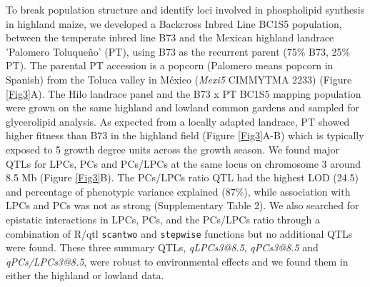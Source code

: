 \documentclass[9pt,twocolumn,twoside,lineno]{BioRxiv}
\def\code#1{\texttt{#1}}
\begin{document}
To break population structure and identify loci involved in phospholipid synthesis in highland maize, we developed a Backcross Inbred Line BC1S5 population, between the temperate inbred line B73 and the Mexican highland landrace 'Palomero Toluqueño' (PT), using B73 as the recurrent parent (75\% B73, 25\% PT). 
The parental PT accession is a popcorn (Palomero means popcorn in Spanish) from the Toluca valley in México (\textit{Mexi5} CIMMYTMA 2233) (Figure \ref{Fig3}A). 
The Hilo landrace panel and the B73 x PT BC1S5 mapping population were grown on the same highland and lowland common gardens and sampled for glycerolipid analysis.
As expected from a locally adapted landrace, PT showed higher fitness than B73  in the highland field (Figure \ref{Fig3}A-B) which is typically exposed to 5 growth degree units across the growth season.
We found major QTLs for LPCs, PCs and PCs/LPCs at the same locus on chromosome 3 around 8.5 Mb (Figure \ref{Fig3}B). 
The PCs/LPCs ratio QTL had the highest LOD (24.5) and percentage of phenotypic variance explained (87\%), while association with LPCs and PCs was not as strong (Supplementary Table 2).
We also searched for epistatic interactions in LPCs, PCs, and the PCs/LPCs ratio through a combination of R/qtl \code{scantwo} and \code{stepwise} functions \cite{Broman2003-ac} but no additional QTLs were found.
These three summary QTLs, \textit{qLPCs3@8.5}, \textit{qPCs3@8.5} and \textit{qPCs/LPCs3@8.5}, were robust to environmental effects and we found them in either the highland or lowland data.
\end{document}
